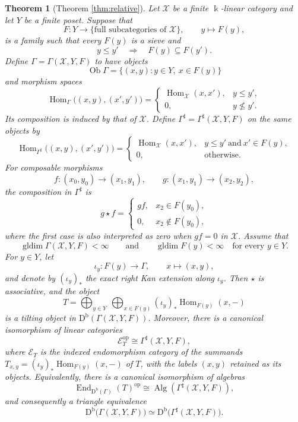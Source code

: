 \documentclass[12pt,a4paper,english,reqno]{amsart}
\theoremstyle{plain}
\newtheorem{theorem}{Theorem}[section]
\theoremstyle{definition}
\newcommand{\kk}{\Bbbk}
\newcommand{\Db}{\mathrm D^{\mathrm b}}
\newcommand{\Hom}{\operatorname{Hom}}
\newcommand{\End}{\operatorname{End}}
\newcommand{\gldim}{\operatorname{gldim}}
\newcommand{\op}{\mathrm{op}}
\newcommand{\X}{\mathcal X}
\newcommand{\G}{\Gamma}
\newcommand{\Gs}{\Gamma^{\sharp}}
\begin{document}
\begin{theorem}[Theorem \ref{thm:relative}]
\label{thm:intro-relative}
Let $\X$ be a finite $\kk$-linear category and let $Y$ be a finite
poset.  Suppose that
\[
 F\colon Y\longrightarrow
 \{\text{full subcategories of }\X\},\qquad
 y\longmapsto F(y),
\]
is a family such that every $F(y)$ is a sieve and
\[
 y\leq y'\quad\Longrightarrow\quad
 F(y)\subseteq F(y').
\]
Define $\G=\G(\X,Y,F)$ to have objects
\[
 \operatorname{Ob}\G
 =\{(x,y):y\in Y,\ x\in F(y)\}
\]
and morphism spaces
\[
 \Hom_{\G}\bigl((x,y),(x',y')\bigr)
 =
 \begin{cases}
  \Hom_{\X}(x,x'),&y\leq y',\\
  0,&y\nleq y'.
 \end{cases}
\]
Its composition is induced by that of $\X$.  Define
$\Gs=\Gs(\X,Y,F)$ on the same objects by
\[
 \Hom_{\Gs}\bigl((x,y),(x',y')\bigr)
 =
 \begin{cases}
  \Hom_{\X}(x,x'),&
  y\leq y'\ \text{and}\ x'\in F(y),\\
  0,&\text{otherwise}.
 \end{cases}
\]
For composable morphisms
\[
 f\colon(x_0,y_0)\longrightarrow(x_1,y_1),
 \qquad
 g\colon(x_1,y_1)\longrightarrow(x_2,y_2),
\]
the composition in $\Gs$ is
\[
 g\star f=
 \begin{cases}
  gf,&x_2\in F(y_0),\\
  0,&x_2\notin F(y_0),
 \end{cases}
\]
where the first case is also interpreted as zero when $gf=0$ in
$\X$.  Assume that
\[
 \gldim\G(\X,Y,F)<\infty
 \qquad\text{and}\qquad
 \gldim F(y)<\infty\quad\text{for every }y\in Y.
\]
For $y\in Y$, let
\[
 \iota_y:F(y)\longrightarrow\G,\qquad x\longmapsto(x,y),
\]
and denote by $(\iota_y)_*$ the exact right Kan extension along
$\iota_y$.  Then $\star$ is associative, and the object
\[
 T=\bigoplus_{y\in Y}\ \bigoplus_{x\in F(y)}
 (\iota_y)_*\Hom_{F(y)}(x,-)
\]
is a tilting object in $\Db(\G(\X,Y,F))$. Moreover, there is a canonical
isomorphism of linear categories
\[
 \mathcal E_T^{\op}\cong\Gs(\X,Y,F),
\]
where $\mathcal E_T$ is the indexed endomorphism category of the summands
$T_{x,y}=(\iota_y)_*\Hom_{F(y)}(x,-)$ of $T$, with the labels $(x,y)$
retained as its objects.
Equivalently, there is a canonical isomorphism of algebras
\[
 \End_{\Db(\G)}(T)^{\op}
 \cong\operatorname{Alg}\!\left(\Gs(\X,Y,F)\right),
\]
and consequently a triangle equivalence
\[
 \Db\bigl(\G(\X,Y,F)\bigr)
 \simeq
 \Db\bigl(\Gs(\X,Y,F)\bigr).
\]
\end{theorem}
\end{document}
